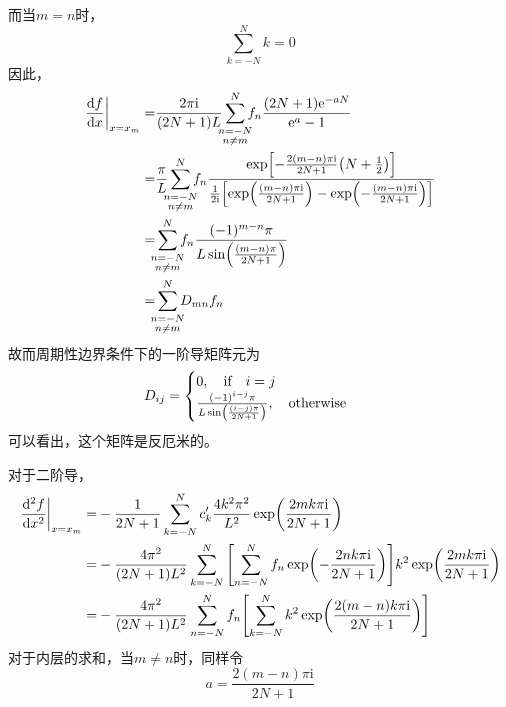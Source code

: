 \documentclass[UTF8,12pt]{article}
\begin{document}
        而当$m=n$时，
        \begin{equation}
            \sum_{k=-N}^N{k}=0
        \end{equation}
        因此，
        \begin{align}
            \eval{\dv{f}{x}}_{x=x_m}=&\frac{2\pi\mathrm{i}}{(2N+1)L}\sum_{\mathclap{\substack{n=-N\\n\neq m}}}^N{f_n\frac{(2N+1)\mathrm{e}^{-aN}}{\mathrm{e}^{a}-1}} \\
            =&\frac{\pi}{L}\sum_{\mathclap{\substack{n=-N\\n\neq m}}}^N{f_n\frac{\exp[-\frac{2(m-n)\pi\mathrm{i}}{2N+1}\qty(N+\frac{1}{2})]}{\frac{1}{2\mathrm{i}}\qty[\exp(\frac{(m-n)\pi\mathrm{i}}{2N+1})-\exp(-\frac{(m-n)\pi\mathrm{i}}{2N+1})]}} \\
            =&\sum_{\mathclap{\substack{n=-N\\n\neq m}}}^N{f_n\frac{(-1)^{m-n}\pi}{L\sin(\frac{(m-n)\pi}{2N+1})}} \\
            =&\sum_{\mathclap{\substack{n=-N\\n\neq m}}}^N{D_{mn}f_n}
        \end{align}
        故而周期性边界条件下的一阶导矩阵元为
        \begin{equation}
            D_{ij}=\begin{cases}
                0,\qif i=j \\
                \frac{(-1)^{i-j}\pi}{L\sin(\frac{(i-j)\pi}{2N+1})},\qotherwise
            \end{cases}
        \end{equation}
        可以看出，这个矩阵是反厄米的。\par
        对于二阶导，
        \begin{align}
            \eval{\dv[2]{f}{x}}_{x=x_m}=&-\frac{1}{2N+1}\sum_{k=-N}^N{c'_k\frac{4k^2\pi^2}{L^2}\exp(\frac{2mk\pi\mathrm{i}}{2N+1})} \\
            =&-\frac{4\pi^2}{(2N+1)L^2}\sum_{k=-N}^N{\qty[\sum_{n=-N}^N{f_n\exp(-\frac{2nk\pi\mathrm{i}}{2N+1})}]k^2\exp(\frac{2mk\pi\mathrm{i}}{2N+1})} \\
            =&-\frac{4\pi^2}{(2N+1)L^2}\sum_{n=-N}^N{f_n\qty[\sum_{k=-N}^N{k^2\exp(\frac{2(m-n)k\pi\mathrm{i}}{2N+1})}]}
        \end{align}
        对于内层的求和，当$m\neq n$时，同样令
        \begin{equation}
            a=\frac{2(m-n)\pi\mathrm{i}}{2N+1}
        \end{equation}
\end{document}
